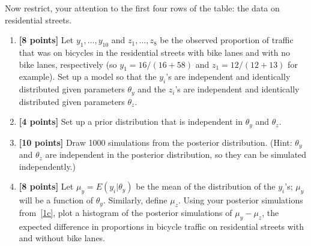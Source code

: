 \documentclass[11pt,notitlepage]{article}
\begin{document}
    Now restrict, your attention to the first four rows of the table: the data on residential streets.
    \begin{enumerate}
        \item \textbf{[8 points]} Let $y_1,\ldots, y_{10}$ and $z_1,\ldots, z_8$ be the observed proportion of traffic that was on bicycles in the residential streets with bike lanes and with no bike lanes, respectively (so $y_1 = 16/(16+58)$ and $z_1=12/(12+13)$ for example). Set up a model so that the $y_i$'s are independent and identically distributed given parameters $\theta_y$ and the $z_i$'s are independent and identically distributed given parameters $\theta_z$.
        \item \textbf{[4 points]} Set up a prior distribution that is independent in $\theta_y$ and $\theta_z$.
        \item \textbf{[10 points]} Draw 1000 simulations from the posterior distribution. (Hint: $\theta_y$ and $\theta_z$ are independent in the
        posterior distribution, so they can be simulated independently.) \label{1c}
        \item \textbf{[8 points]} Let $\mu_y = E(y_i|\theta_y)$ be the mean of the distribution of the $y_i$'s; $\mu_y$ will be a function of $\theta_y$. Similarly, define $\mu_z$. Using your posterior simulations from~\ref{1c}, plot a histogram of the posterior simulations of $\mu_y-\mu_z$, the expected difference in proportions in bicycle traffic on residential streets with and without bike lanes.
    \end{enumerate}
	\begin{exercise}[Solution]
        
    \end{exercise}
\end{document}
